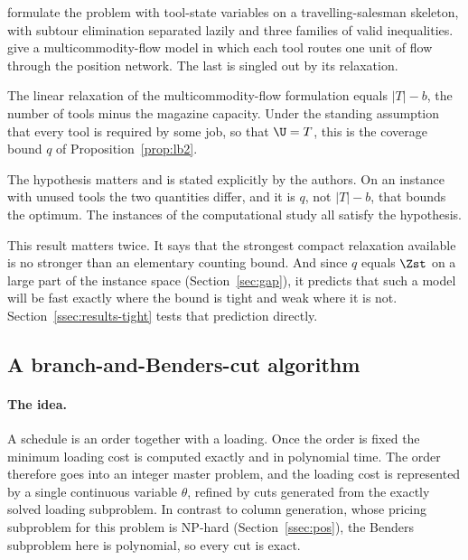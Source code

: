\citet{Laporte2004} formulate the problem with tool-state variables on a
travelling-salesman skeleton, with subtour elimination separated lazily and three
families of valid inequalities. \citet{daSilva2024} give a multicommodity-flow model
in which each tool routes one unit of flow through the position network. The last is
singled out by its relaxation.

\begin{proposition}\label{prop:sspmf-lp}
The linear relaxation of the multicommodity-flow formulation equals
$\lvert T\rvert-b$, the number of tools minus the magazine capacity. Under the
standing assumption that every tool is required by some job, so that $\U=T$, this is
the coverage bound $q$ of Proposition~\ref{prop:lb2}.
\end{proposition}

The hypothesis matters and is stated explicitly by the authors. On an instance with
unused tools the two quantities differ, and it is $q$, not $\lvert T\rvert-b$, that
bounds the optimum. The instances of the computational study all satisfy the
hypothesis.

This result matters twice. It says that the strongest compact relaxation available is
no stronger than an elementary counting bound. And since $q$ equals $\Zst$ on a large
part of the instance space (Section~\ref{sec:gap}), it predicts that such a model will
be fast exactly where the bound is tight and weak where it is not.
Section~\ref{ssec:results-tight} tests that prediction directly.

\subsection{A branch-and-Benders-cut algorithm}\label{ssec:bbc}

\paragraph{The idea.}
A schedule is an order together with a loading. Once the order is fixed the minimum
loading cost is computed exactly and in polynomial time. The order therefore goes into
an integer master problem, and the loading cost is represented by a single continuous
variable $\theta$, refined by cuts generated from the exactly solved loading
subproblem. In contrast to column generation, whose pricing subproblem for this
problem is NP-hard (Section~\ref{ssec:pos}), the Benders subproblem here is
polynomial, so every cut is exact.


